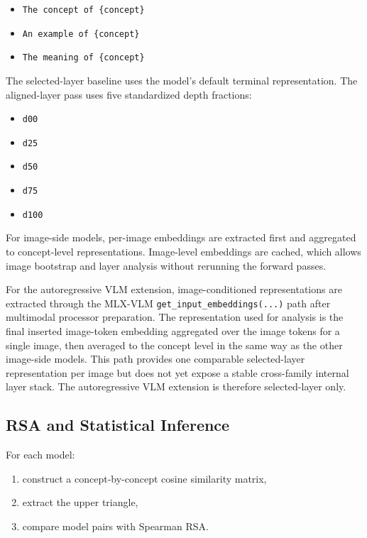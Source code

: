 \documentclass[11pt,a4paper]{article}
\providecommand{\tightlist}{%
  \setlength{\itemsep}{0pt}\setlength{\parskip}{0pt}}
\begin{document}
\begin{itemize}
\tightlist
\item
  \texttt{The\ concept\ of\ \{concept\}}
\item
  \texttt{An\ example\ of\ \{concept\}}
\item
  \texttt{The\ meaning\ of\ \{concept\}}
\end{itemize}

The selected-layer baseline uses the model's default terminal
representation. The aligned-layer pass uses five standardized depth
fractions:

\begin{itemize}
\tightlist
\item
  \texttt{d00}
\item
  \texttt{d25}
\item
  \texttt{d50}
\item
  \texttt{d75}
\item
  \texttt{d100}
\end{itemize}

For image-side models, per-image embeddings are extracted first and
aggregated to concept-level representations. Image-level embeddings are
cached, which allows image bootstrap and layer analysis without
rerunning the forward passes.

For the autoregressive VLM extension, image-conditioned representations
are extracted through the MLX-VLM \texttt{get\_input\_embeddings(...)}
path after multimodal processor preparation. The representation used for
analysis is the final inserted image-token embedding aggregated over the
image tokens for a single image, then averaged to the concept level in
the same way as the other image-side models. This path provides one
comparable selected-layer representation per image but does not yet
expose a stable cross-family internal layer stack. The autoregressive
VLM extension is therefore selected-layer only.

\subsection{RSA and Statistical
Inference}\label{rsa-and-statistical-inference}

For each model:

\begin{enumerate}
\def\labelenumi{\arabic{enumi}.}
\tightlist
\item
  construct a concept-by-concept cosine similarity matrix,
\item
  extract the upper triangle,
\item
  compare model pairs with Spearman RSA.
\end{enumerate}
\end{document}
